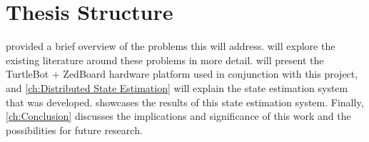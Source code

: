 \documentclass[thesis.tex]{subfile}
\begin{document}
\section{Thesis Structure} %
 provided a brief overview of the problems this will address.  will explore the existing literature around these problems in more detail.  will present the TurtleBot + ZedBoard hardware platform used in conjunction with this project, and \cref{ch:Distributed State Estimation} will explain the state estimation system that was developed.  showcases the results of this state estimation system. Finally, \cref{ch:Conclusion} discusses the implications and significance of this work and the possibilities for future research.
\end{document}
